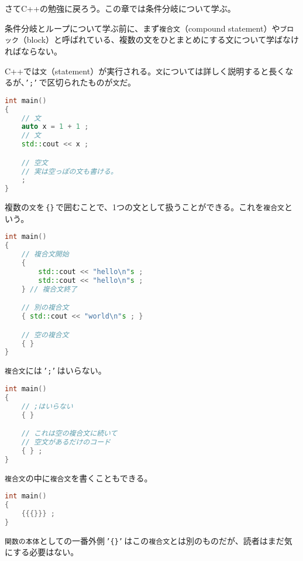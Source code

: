 
さてC++の勉強に戻ろう。この章では条件分岐について学ぶ。


条件分岐とループについて学ぶ前に、まず\texttt{複合文}（compound statement）や\texttt{ブロック}（block）と呼ばれている、複数の文をひとまとめにする文について学ばなければならない。

C++では\texttt{文}（statement）が実行される。\texttt{文}については詳しく説明すると長くなるが、\texttt{';'}\,で区切られたものが\texttt{文}だ。

\begin{lstlisting}[language={C++}]
int main()
{
    // 文
    auto x = 1 + 1 ;
    // 文
    std::cout << x ;

    // 空文
    // 実は空っぽの文も書ける。
    ;
}
\end{lstlisting}

複数の\texttt{文}を\,\texttt{\{\}}\,で囲むことで、1つの文として扱うことができる。これを\texttt{複合文}という。

\ifTombow\pagebreak\fi
\begin{lstlisting}[language={C++}]
int main()
{
    // 複合文開始
    {
        std::cout << "hello\n"s ;
        std::cout << "hello\n"s ;
    } // 複合文終了

    // 別の複合文
    { std::cout << "world\n"s ; }

    // 空の複合文
    { }
}
\end{lstlisting}

\texttt{複合文}には\,\texttt{';'}\,はいらない。

\begin{lstlisting}[language={C++}]
int main()
{
    // ;はいらない
    { }

    // これは空の複合文に続いて
    // 空文があるだけのコード
    { } ;
}
\end{lstlisting}

\texttt{複合文}の中に\texttt{複合文}を書くこともできる。

\begin{lstlisting}[language={C++}]
int main()
{
    {{{}}} ;
}
\end{lstlisting}

\texttt{関数の本体}としての一番外側\,\texttt{'\{\}'}\,はこの\texttt{複合文}とは別のものだが、読者はまだ気にする必要はない。

